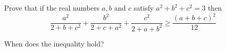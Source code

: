 Prove that if the real numbers $a,b$ and $c$ satisfy $a^2+b^2+c^2=3$ then\[\frac{a^2}{2+b+c^2}+\frac{b^2}{2+c+a^2}+\frac{c^2}{2+a+b^2}\ge\frac{(a+b+c)^2}{12}\]

When does the inequality hold?
